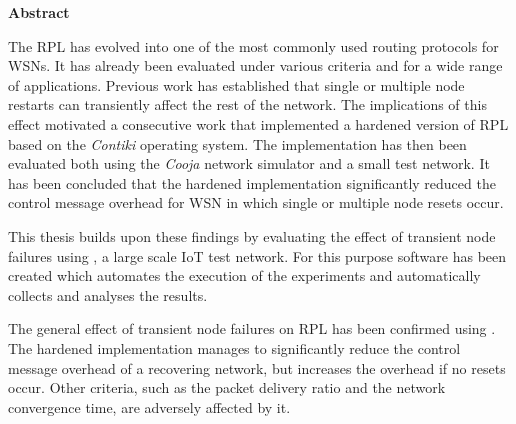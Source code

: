 \thispagestyle{plain} %
\centerline{\bfseries Abstract}
\vspace*{1em}
\noindent

The \ac{RPL} has evolved into one of the most commonly used routing protocols
for \acp{WSN}. It has already been evaluated under various criteria and for a
wide range of applications. Previous work has established that single or
multiple node restarts can transiently affect the rest of the network. The
implications of this effect motivated a consecutive work that implemented a
hardened version of \ac{RPL} based on the \emph{Contiki} operating system. The
implementation has then been evaluated both using the \emph{Cooja} network
simulator and a small test network. It has been concluded that the hardened
implementation significantly reduced the control message overhead for \ac{WSN}
in which single or multiple node resets occur.

This thesis builds upon these findings by evaluating the effect of transient
node failures using \fitlab, a large scale \ac{IoT} test network. For this
purpose software has been created which automates the execution of the
experiments and automatically collects and analyses the results.

The general effect of transient node failures on \ac{RPL} has been confirmed
using \fitlab. The hardened implementation manages to significantly reduce the
control message overhead of a recovering network, but increases the overhead if
no resets occur. Other criteria, such as the packet delivery ratio and the
network convergence time, are adversely affected by it.

\acresetall

%
\cleardoublepage